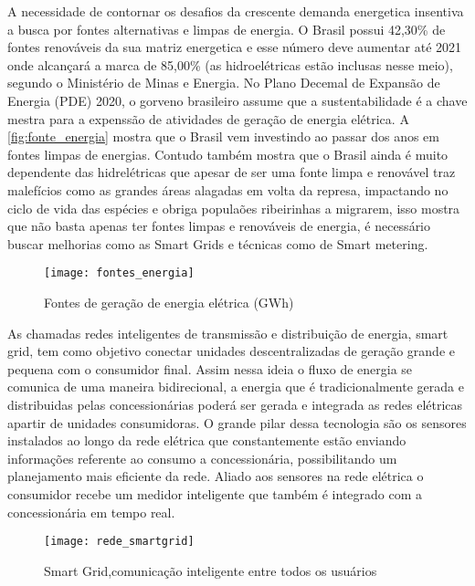 A necessidade de contornar os desafios da crescente demanda energetica insentiva a busca por fontes alternativas e limpas de energia. O Brasil 
possui 42,30\% de fontes renováveis da sua matriz energetica e esse número deve aumentar até 2021 onde alcançará a marca de 85,00\% (as hidroelétricas
estão inclusas nesse meio), segundo o Ministério de Minas e Energia. No Plano Decemal de Expansão de Energia (PDE) 2020, o gorveno brasileiro
assume que a sustentabilidade é a chave mestra para a expenssão de atividades de geração de energia elétrica. A \autoref{fig:fonte_energia} mostra
que o Brasil vem investindo ao passar dos anos em fontes limpas de energias. Contudo também mostra que o Brasil ainda é muito dependente das 
hidrelétricas que apesar de ser uma fonte limpa e renovável traz malefícios como as grandes áreas alagadas em volta da represa, impactando no
ciclo de vida das espécies e obriga populaões ribeirinhas a migrarem, isso mostra que não basta apenas ter fontes limpas
e renováveis de energia, é necessário buscar melhorias como as Smart Grids e técnicas como de Smart metering.

\begin{figure}[h!]
	\texttt{[image: fontes\_energia]}
	\centering
	\caption[Fontes de geração de energia elétrica (GWh)]{Fontes de geração de energia elétrica (GWh)}
	\label{fig:fonte_energia}
\end{figure}
\FloatBarrier

As chamadas redes inteligentes de transmissão e distribuição de energia, smart grid, tem como objetivo conectar unidades descentralizadas de geração
grande e pequena com o consumidor final. Assim nessa ideia o fluxo de energia se comunica de uma maneira bidirecional, a energia que é tradicionalmente
gerada e distribuidas pelas concessionárias poderá ser gerada e integrada as redes elétricas apartir de unidades consumidoras. O grande pilar dessa 
tecnologia são os sensores instalados ao longo da rede elétrica que constantemente estão enviando informações referente ao consumo a concessionária,
possibilitando um planejamento mais eficiente da rede. Aliado aos sensores na rede elétrica o consumidor recebe um medidor inteligente que também
é integrado com a concessionária em tempo real.

\begin{figure}[h!]
	\texttt{[image: rede\_smartgrid]}
	\centering
	\caption[Smart Grid,comunicação inteligente entre todos os usuários]{Smart Grid,comunicação inteligente entre todos os usuários}
	\label{fig:rede_smartgrid}
\end{figure}
\FloatBarrier

